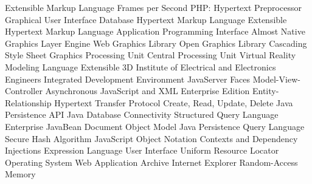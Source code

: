  {Extensible Markup Language}
 {Frames per Second}
 {PHP: Hypertext Preprocessor}
 {Graphical User Interface}
 {Database}
 {Hypertext Markup Language}
 {Extensible Hypertext Markup Language}
 {Application Programming Interface}
 {Almost Native Graphics Layer Engine}
 {Web Graphics Library}
 {Open Graphics Library}
 {Cascading Style Sheet}
 {Graphics Processing Unit}
 {Central Processing Unit}
 {Virtual Reality Modeling Language}
 {Extensible 3D}
 {Institute of Electrical and Electronics Engineers}
 {Integrated Development Environment}
 {JavaServer Faces}
 {Model-View-Controller}
 {Asynchronous JavaScript and XML}
 {Enterprise Edition}
 {Entity-Relationship}
 {Hypertext Transfer Protocol}
 {Create, Read, Update, Delete}
 {Java Persistence API}
 {Java Database Connectivity}
 {Structured Query Language}
 {Enterprise JavaBean}
 {Document Object Model}
 {Java Persistence Query Language}
 {Secure Hash Algorithm}
 {JavaScript Object Notation}
 {Contexts and Dependency Injections}
 {Expression Language}
 {User Interface}
 {Uniform Resource Locator}
 {Operating System}
 {Web Application Archive}
 {Internet Explorer}
 {Random-Access Memory}